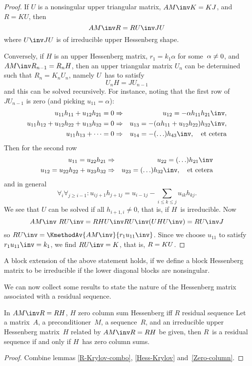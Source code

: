 \begin{proof} If $U$ is a nonsingular upper triangular matrix, $AM\inv
K=KJ$, and $R=KU$, then
\[ AM\inv R=RU\inv JU \] where $U\inv JU$ is of irreducible
upper Hessenberg shape.

Conversely, if $H$ is an upper Hessenberg matrix, $r_1= k_1\alpha$ for
some~$\alpha\not=\nobreak 0$, and $AM\inv R_{n-1}=R_nH$, then an upper
triangular matrix $U_n$ can be determined such that
$R_n=K_nU_n$, namely $U$~has to satisfy 
\[U_nH=JU_{n-1}\]
and this can be solved recursively.  For instance, noting that the
first row of $JU_{n-1}$ is zero (and picking $u_{11}=\alpha$):
\begin{eqnarray*}
u_{11}h_{11}+u_{12}h_{21}=0
    &\Rightarrow&u_{12}=-\alpha h_{11}h_{21}\inv,\\
u_{11}h_{12}+u_{12}h_{22}+u_{13}h_{32}=0
    &\Rightarrow&u_{13}=-(\alpha h_{11}+u_{12}h_{22})h_{32}\inv,\\
u_{11}h_{13}+\cdots=0
    &\Rightarrow&u_{14}=-(\ldots)h_{43}\inv,\quad\hbox{et cetera}
\end{eqnarray*}
Then for the second row
\begin{eqnarray*}
u_{11}=u_{22}h_{21}&\Rightarrow&u_{22}=(\ldots)h_{21}\inv\\
u_{12}=u_{22}h_{22}+u_{23}h_{32}&\Rightarrow&u_{23}=(\ldots)h_{32}\inv,
\quad\hbox{et cetera}
\end{eqnarray*}
and in general
\[ \forall_i\forall_{j\geq i-1}\colon
     u_{ij+1}h_{j+1j}=u_{i-1j}-\sum_{i\leq k\leq j}u_{ik}h_{kj}. \]
We see that $U$ can be solved if all $h_{i+1,i}\not=0$,
that is, if $H$~is irreducible. Now 
\[ AM\inv\ RU\inv =RHU\inv RU\inv (UHU\inv)=RU\inv J \]
so $RU\inv=\KmethodAv{AM\inv}{r_1u_{11}\inv}$.
Since we choose $u_{11}$ to satisfy $r_1u_{11}\inv=k_1$, 
we find $RU\inv= K$, that is, $R=\nobreak KU$.
\end{proof}

\begin{block}
A block extension of the above statement holds, if
we define a block Hessenberg matrix to be irreducible if the lower diagonal
blocks are nonsingular.
\end{block}

We can now collect some results to state the nature of the
Hessenberg matrix associated with a residual sequence.

\begin{ttheorem}{In $AM\inv R=RH$, $H$ zero column sum
Hessenberg iff $R$ residual sequence}
\label{zero-col-residual}
Let a matrix~$A$, a preconditioner~$M$, a sequence~$R$, and an
irreducible upper Hessenberg matrix~$H$ related by $AM\inv R=RH$ be
given, then $R$~is a residual sequence if and only if $H$~has zero
column sums.
\end{ttheorem}
\begin{proof} Combine lemmas \ref{R-Krylov-combo}, \ref{Hess-Krylov} 
and~\ref{Zero-column}.\end{proof}

